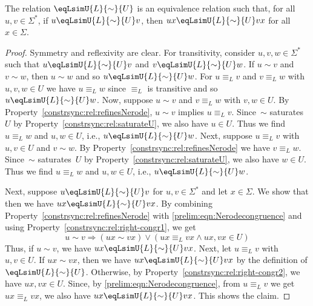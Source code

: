 \begin{theorem} \label{constrsync:thm:relation-right-congruence}
The relation $\eqLsimU{L}{\sim}{U}$ is an equivalence
relation such that, for all $u,v \in \Sigma^*$,
if $u \eqLsimU{L}{\sim}{U} v$,
then $ux \eqLsimU{L}{\sim}{U} vx$ for all $x \in \Sigma$.
\end{theorem}
\begin{proof}
Symmetry and reflexivity are clear.
For transitivity, consider $u,v,w \in \Sigma^*$
such that $u \eqLsimU{L}{\sim}{U} v$
and $v \eqLsimU{L}{\sim}{U} w$.
If $u \sim v$ and $v \sim w$, then $u \sim w$
and so $u \eqLsimU{L}{\sim}{U} w$.
For $u \equiv_L v$ and $v \equiv_L w$ with $u,v,w \in U$
we have $u \equiv_L w$ 
since $\equiv_L$ is transitive and so $u \eqLsimU{L}{\sim}{U} w$.
Now, suppose $u \sim v$ and $v \equiv_L w$ with $v,w \in U$.
By Property~\ref{constrsync:rel:refinesNerode},
$u \sim v$ implies $u \equiv_L v$.
Since~$\sim$ 
saturates~$U$ by Property~\ref{constrsync:rel:saturateU},
we also have $u \in U$. Thus we find $u \equiv_L w$
and $u,w \in U$, i.e., $u \eqLsimU{L}{\sim}{U} w$.
Next, suppose $u \equiv_L v$ with $u,v \in U$
and $v \sim w$. By Property~\ref{constrsync:rel:refinesNerode}
we have $v \equiv_L w$. Since~$\sim$ 
saturates~$U$ by Property~\ref{constrsync:rel:saturateU},
we also have $w \in U$.
Thus we find $u \equiv_L w$
and $u,w \in U$, i.e., $u \eqLsimU{L}{\sim}{U} w$.

Next, suppose $u \eqLsimU{L}{\sim}{U} v$ for $u,v \in \Sigma^*$
and let $x \in \Sigma$. We show that then we have $ux \eqLsimU{L}{\sim}{U} vx$.
By combining Property~\ref{constrsync:rel:refinesNerode}
with \cref{prelim:eqn:Nerodecongruence}
and using Property~\ref{constrsync:rel:right-congr1}, we get
\[
u \sim v 
\Rightarrow 
( ux \sim vx ) \lor ( ux \equiv_L vx \land ux, vx \in U )
\]
Thus, if $u \sim v$, we have $ux \eqLsimU{L}{\sim}{U} vx$.
Next, let $u \equiv_L v$ with $u,v \in U$.
If $ux \sim vx$, then we have $ux \eqLsimU{L}{\sim}{U} vx$ 
by the definition of $\eqLsimU{L}{\sim}{U}$.
Otherwise, by Property~\ref{constrsync:rel:right-congr2},
we have $ux, vx \in U$. Since, by \cref{prelim:eqn:Nerodecongruence}, 
from $u \equiv_L v$ we get $ux \equiv_L vx$,
we also have $ux \eqLsimU{L}{\sim}{U} vx$. This shows the claim.
\end{proof}

